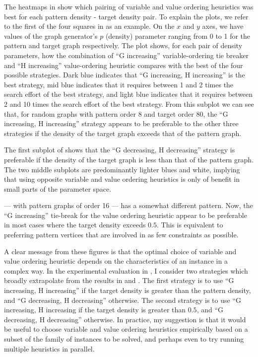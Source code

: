 The heatmaps in  show which pairing of variable and value
ordering heuristics was best for each pattern density - target density pair.  To explain
the plots, we refer to the first of the four squares in 
as an example.  On the $x$ and $y$ axes, we have values of the graph generator's $p$
(density) parameter ranging from 0 to 1 for the pattern
and target graph respectively.  The plot shows, for each pair of density
parameters, how the combination of ``G increasing'' variable-ordering tie breaker
and ``H increasing'' value-ordering heuristic compares with the best of the four
possible strategies.  Dark blue indicates that ``G increasing, H increasing'' is
the best strategy, mid blue indicates that it requires between 1 and 2 times the search
effort of the best strategy, and light blue indicates that it requires between 2 and
10 times the search effort of the best strategy.  From this subplot we can see that,
for random graphs with pattern order 8 and target order 80, the ``G increasing,
H increasing'' strategy appears to be preferable to the other three strategies
if the density of the target graph exceeds that of the pattern graph.

The first subplot of
shows that the ``G decreasing, H decreasing'' strategy is
preferable if the density of the target graph is less than that of the pattern graph.
The two middle subplots are predominantly lighter blues and white, implying that
using opposite variable and value ordering heuristics is only of benefit in small
parts of the parameter space.

 --- with pattern graphs of order 16 --- has a somewhat different
pattern.  Now, the ``G increasing'' tie-break for the value ordering heuristic
appear to be preferable in most cases where the target density exceeds $0.5$.  This is equivalent
to preferring pattern vertices that are involved in as few constraints as possible.

A clear message from these figures is that the optimal choice of variable and
value ordering heuristic depends on the characteristics of an instance in a
complex way.
In the experimental evaluation in , I consider two 
strategies which broadly extrapolate from the results in
 and
.  The first strategy is to use ``G increasing, H increasing''
if the target density is greater than the pattern density, and ``G decreasing, H decreasing''
otherwise.  The second strategy is to use ``G increasing, H increasing if the target
density is greater than $0.5$, and ``G decreasing, H decreasing'' otherwise.
In practice, my suggestion is that it would be useful to choose
variable and value ordering heuristics empirically based on a subset of the family
of instances to be solved, and perhaps even to try running multiple heuristics
in parallel.

